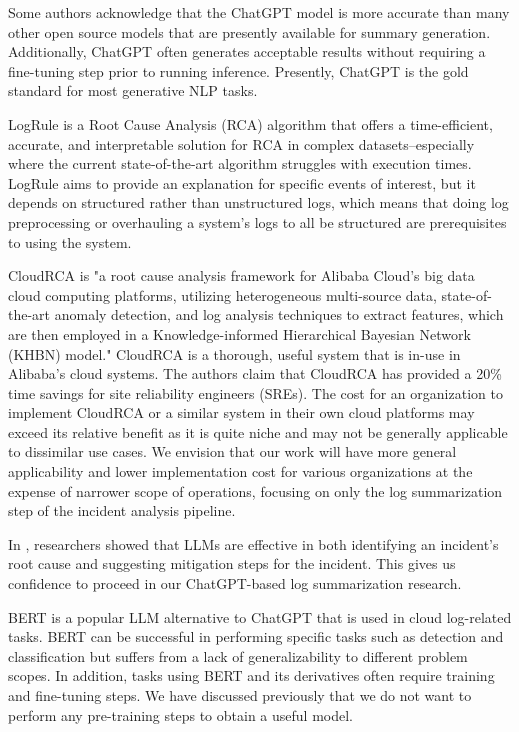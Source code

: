 \documentclass[conference]{IEEEtran}
\begin{document}
Some authors acknowledge that the ChatGPT model is more accurate than many other open source models that are presently available for summary generation. Additionally, ChatGPT often generates acceptable results without requiring a fine-tuning step prior to running inference. Presently, ChatGPT is the gold standard for most generative NLP tasks.\cite{bendimerad2023onpremise}

LogRule \cite{logrule} is a Root Cause Analysis (RCA) algorithm that offers a time-efficient, accurate, and interpretable solution for RCA in complex datasets--especially where the current state-of-the-art algorithm struggles with execution times. LogRule aims to provide an explanation for specific events of interest, but it depends on structured rather than unstructured logs, which means that doing log preprocessing or overhauling a system's logs to all be structured are prerequisites to using the system.

CloudRCA is "a root cause analysis framework for Alibaba Cloud's big data cloud computing platforms, utilizing heterogeneous multi-source data, state-of-the-art anomaly detection, and log analysis techniques to extract features, which are then employed in a Knowledge-informed Hierarchical Bayesian Network (KHBN) model." \cite{10.1145/3459637.3481903} CloudRCA is a thorough, useful system that is in-use in Alibaba's cloud systems. The authors claim that CloudRCA has provided a 20\% time savings for site reliability engineers (SREs). The cost for an organization to implement CloudRCA or a similar system in their own cloud platforms may exceed its relative benefit as it is quite niche and may not be generally applicable to dissimilar use cases. We envision that our work will have more general applicability and lower implementation cost for various organizations at the expense of narrower scope of operations, focusing on only the log summarization step of the incident analysis pipeline.

In \cite{10172904}, researchers showed that LLMs are effective in both identifying an incident's root cause and suggesting mitigation steps for the incident. This gives us confidence to proceed in our ChatGPT-based log summarization research.

BERT is a popular LLM alternative to ChatGPT that is used in cloud log-related tasks. BERT can be successful in performing specific tasks such as detection and classification but suffers from a lack of generalizability to different problem scopes. In addition, tasks using BERT and its derivatives often require training and fine-tuning steps. We have discussed previously that we do not want to perform any pre-training steps to obtain a useful model.
\end{document}
